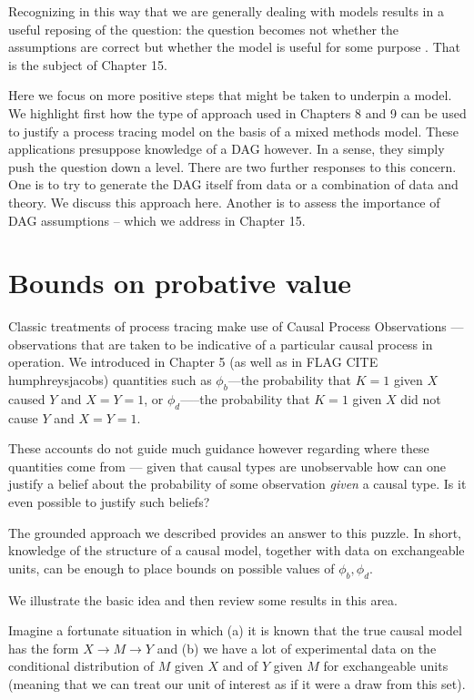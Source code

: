 \documentclass[12pt,]{book}
\begin{document}
Recognizing in this way that we are generally dealing with models results in a useful reposing of the question: the question becomes not whether the assumptions are correct but whether the model is useful for some purpose \citep{clarke2012model}. That is the subject of Chapter 15.

Here we focus on more positive steps that might be taken to underpin a model. We highlight first how the type of approach used in Chapters 8 and 9 can be used to justify a process tracing model on the basis of a mixed methods model. These applications presuppose knowledge of a DAG however. In a sense, they simply push the question down a level. There are two further responses to this concern. One is to try to generate the DAG itself from data or a combination of data and theory. We discuss this approach here. Another is to assess the importance of DAG assumptions -- which we address in Chapter 15.

\hypertarget{bounds-on-probative-value}{%
\section{Bounds on probative value}\label{bounds-on-probative-value}}

Classic treatments of process tracing make use of Causal Process Observations --- observations that are taken to be indicative of a particular causal process in operation. We introduced in Chapter 5 (as well as in FLAG CITE humphreysjacobs) quantities such as \(\phi_{b}\)---the probability that \(K=1\) given \(X\) caused \(Y\) and \(X=Y=1\), or \(\phi_{d}\)-----the probability that \(K=1\) given \(X\) did not cause \(Y\) and \(X=Y=1\).

These accounts do not guide much guidance however regarding where these quantities come from --- given that causal types are unobservable how can one justify a belief about the probability of some observation \emph{given} a causal type. Is it even possible to justify such beliefs?

The grounded approach we described provides an answer to this puzzle. In short, knowledge of the structure of a causal model, together with data on exchangeable units, can be enough to place bounds on possible values of \(\phi_{b}, \phi_{d}\).

We illustrate the basic idea and then review some results in this area.

Imagine a fortunate situation in which (a) it is known that the true causal model has the form \(X \rightarrow M \rightarrow Y\) and (b) we have a lot of experimental data on the conditional distribution of \(M\) given \(X\) and of \(Y\) given \(M\) for exchangeable units (meaning that we can treat our unit of interest as if it were a draw from this set).
\end{document}
